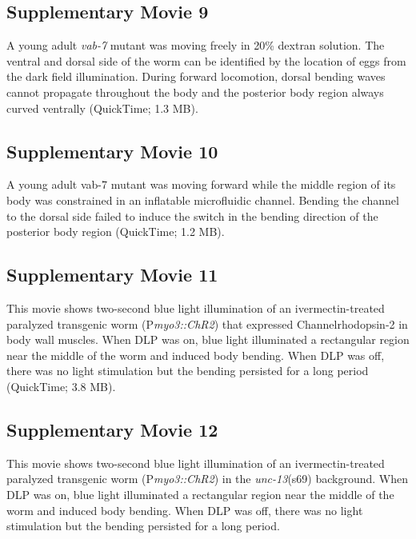 \subsection{Supplementary Movie 9}\label{movie:prop9}
 
A young adult \textit{vab-7} mutant was moving freely in 20\% dextran solution. The ventral and dorsal 
side of the worm can be identified by the location of eggs from the dark field illumination. 
During forward locomotion, dorsal bending waves cannot propagate throughout the body and the 
posterior body region always curved ventrally (QuickTime; 1.3 MB). 
 
\subsection{Supplementary Movie 10} \label{movie:prop10}
 
A young adult vab-7 mutant was moving forward while the middle region of its body was 
constrained in an inflatable microfluidic channel. Bending the channel to the dorsal side failed to 
induce the switch in the bending direction of the posterior body region (QuickTime; 1.2 MB). 
 
\subsection{Supplementary Movie 11}\label{movie:prop11}
 
This movie shows two-second blue light illumination of an ivermectin-treated paralyzed 
transgenic worm (P\textit{myo3::ChR2}) that expressed Channelrhodopsin-2 in body wall muscles. 
When DLP was on, blue light illuminated a rectangular region near the middle of the worm and 
induced body bending. When DLP was off, there was no light stimulation but the bending 
persisted for a long period (QuickTime; 3.8 MB). 
 
 
\subsection{Supplementary Movie 12}\label{movie:prop12}
 
This movie shows two-second blue light illumination of an ivermectin-treated paralyzed 
transgenic worm (P\textit{myo3::ChR2}) in the \textit{unc-13}(s69) background. When DLP was on, blue light 
illuminated a rectangular region near the middle of the worm and induced body bending. When 
DLP was off, there was no light stimulation but the bending persisted for a long period. 



